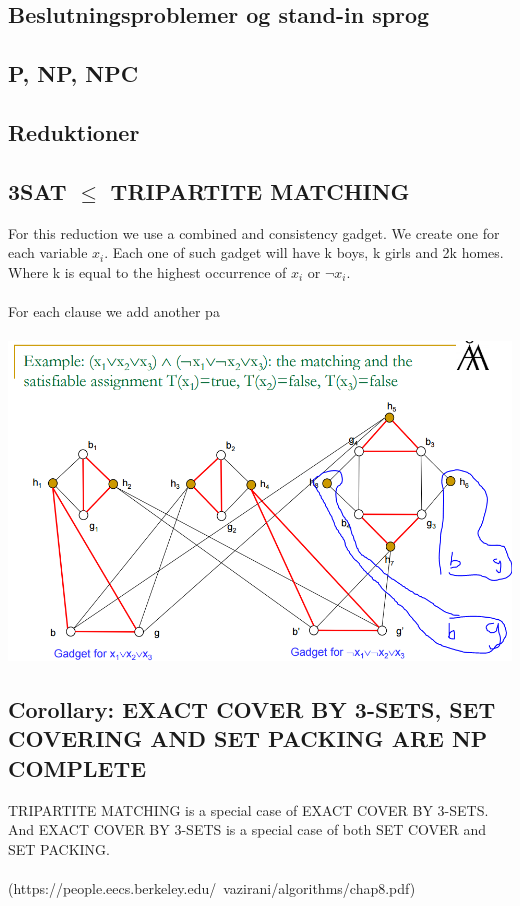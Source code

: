 \subsection{Beslutningsproblemer og stand-in sprog}
\subsection{P, NP, NPC}
\subsection{Reduktioner}
\subsection{3SAT $\le$ TRIPARTITE MATCHING}
For this reduction we use a combined  and consistency gadget. We create one for each variable $x_i$. Each one of such gadget will have k boys, k girls and 2k homes. Where k is equal to the highest occurrence of $x_i$ or $\lnot x_i$.\\\\

For each clause we add another pa\\\\
\includegraphics[scale=0.5]{tripartite}
\subsection{Corollary: EXACT COVER BY 3-SETS, SET COVERING AND SET PACKING ARE NP COMPLETE}
TRIPARTITE MATCHING is a special case of EXACT COVER BY 3-SETS. And EXACT COVER BY 3-SETS is a special case of both SET COVER and SET PACKING.\\\\ (https://people.eecs.berkeley.edu/~vazirani/algorithms/chap8.pdf)
